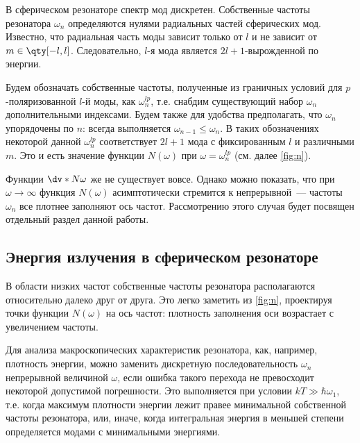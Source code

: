     В сферическом резонаторе спектр мод дискретен. Собственные частоты резонатора $\omega_n$ определяются нулями радиальных частей сферических мод. Известно, что радиальная часть моды зависит только от $l$ и не зависит от $m \in \qty[-l,l]$. Следовательно, $l$-я мода является $2l + 1$-вырожденной по энергии.

    Будем обозначать собственные частоты, полученные из граничных условий для $p$-поляризованной $l$-й моды, как $\omega^{lp}_n$, т.е. снабдим существующий набор $\omega_n$ дополнительными индексами. Будем также для удобства предполагать, что $\omega_n$ упорядочены по $n$: всегда выполняется $\omega_{n-1} \le \omega_n$. В таких обозначениях некоторой данной $\omega^{lp}_n$ соответствует $2l + 1$ мода с фиксированным $l$ и различными $m$. Это и есть значение функции $N(\omega)$ при $\omega = \omega^{lp}_n$ (см. далее \autoref{fig:n}).

    Функции $\dv*{N}{\omega}$ же не существует вовсе. Однако можно показать, что при $\omega \to \infty$ функция $N(\omega)$ асимптотически стремится к непрерывной~--- частоты $\omega_n$ все плотнее заполняют ось частот. Рассмотрению этого случая будет посвящен отдельный раздел данной работы.

%
%
%
%
%
%

\subsection{Энергия излучения в сферическом резонаторе}

    В области низких частот собственные частоты резонатора располагаются относительно далеко друг от друга. Это легко заметить из \autoref{fig:n}, проектируя точки функции $N(\omega)$ на ось частот: плотность заполнения оси возрастает с увеличением частоты.

    Для анализа макроскопических характеристик резонатора, как, например, плотность энергии, можно заменить дискретную последовательность $\omega_n$ непрерывной величиной $\omega$, если ошибка такого перехода не превосходит некоторой допустимой погрешности. Это выполняется при условии $kT \gg \hbar \omega_1$, т.е. когда максимум плотности энергии лежит правее минимальной собственной частоты резонатора, или, иначе, когда интегральная энергия в меньшей степени определяется модами с минимальными энергиями.

